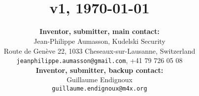 
\title{
\Huge{\gravity} \\[0.15cm]
\large{v1}, \today
}

\author{
    \textbf{Inventor, submitter, main contact:}  \\[0.15cm]
    Jean-Philippe Aumasson, Kudelski Security \\[0.15cm]
    Route de Genève 22, 1033 Cheseaux-sur-Lausanne, Switzerland \\[0.15cm]
    \texttt{jeanphilippe.aumasson@gmail.com}, +41 79 726 05 08 \\[0.5cm]
    \textbf{Inventor, submitter, backup contact:}  \\[0.15cm]
    Guillaume Endignoux \\[0.15cm]
    \texttt{guillaume.endignoux@m4x.org} \\[0.5cm]
}

\date{}

\maketitle

